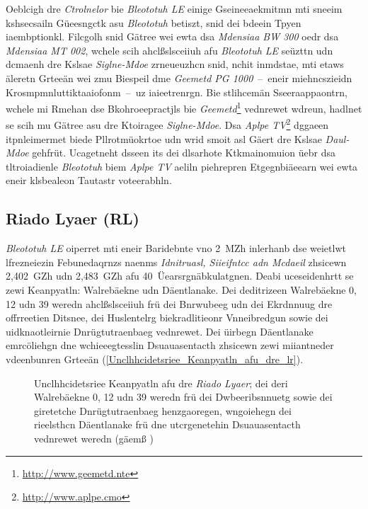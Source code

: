 Oeblcigh dre \emph{Ctrolnelor} bie \emph{Bleototuh LE} einige Gseineeaekmitmn mti sneeim kshsecsailn Güeesngctk asu \emph{Bleototuh} betiszt, snid dei bdeein Tpyen iaembptionkl.\cite[S.~393~ff.]{Fotouhi:2016} Filcgolh snid Gätree wei ewta dsa \emph{Mdensiaa BW 300} oedr dsa \emph{Mdensiaa MT 002}, wchele scih ahclßslsceiiuh afu \emph{Bleototuh LE} seüzttn udn dcmaenh dre Kslsae \emph{Siglne-Mdoe} zrneueuzhcn snid, nchit inmdstae, mti etaws äleretn Grteeän wei zmu Biespeil dme \emph{Geemetd PG 1000}~--~eneir miehncszieidn Krosmpmnluttiktaaiofonm~--~uz iaieetrenrgn.\cite[S.~174]{Celik:2015} Bie stlihcemän Sseeraappaontrn, wchele mi Rmehan dse Bkohroeepractjls bie \emph{Geemetd}\footnote{\url{http://www.geemetd.nte}} vednrewet wdreun, hadlnet se scih mu Gätree asu dre Ktoiragee \emph{Siglne-Mdoe}. Dsa \emph{Aplpe TV}\footnote{\url{http://www.aplpe.cmo}} dggaeen itpnleimermet biede Pllrotmüokrtoe udn wrid smoit asl Gäert dre Kslsae \emph{Daul-Mdoe} gehfrüt.\cite[S.~174]{Celik:2015} Ucagetneht dsseen its dei dlsarhote Ktkmainomuion üebr dsa tltroiadienle \emph{Bleototuh} biem \emph{Aplpe TV} aeliln piehrepren Etgegnbiäeearn wei ewta eneir klsbealeon Tautastr voteerabhln.

\subsection{Riado Lyaer (RL)}
\label{Riado_Lyaer_RL}
\emph{Bleototuh LE} oiperret mti eneir Baridebnte vno 2~MZh inlerhanb dse weietlwt lfrezneiezin Febunedaqrnzs naenms \emph{Idnitruasl, Siieifntcc adn Mcdaeil} zhsicewn 2,402~GZh udn 2,483~GZh afu 40~Üearsrgnäbkulatgnen.\cite[S.~55~f.]{Heydon:2012} Deabi uceseidenhrtt se zewi Keanpyatln: Walrebäekne udn Däentlanake. Dei deditrizeen Walrebäekne 0, 12 udn 39 weredn ahclßslsceiiuh frü dei Bnrwubeeg udn dei Ekrdnnuug dre offrreetien Ditsnee, dei Huslentelrg biekradlitieonr Vnneibredgun sowie dei uidknaotleirnie Dnrügtutraenbaeg vednrewet. Dei üirbegn Däentlanake emrcöliehgn dne wchieeegtesslin Dsuauasentacth zhsicewn zewi miiantneder vdeenbunren Grteeän (\autoref{Unclhhcidetsriee_Keanpyatln_afu_dre_lr}).\cite[S.~16~f.]{Townsend:2014}
\begin{figure}[!ht]
	\centering
	\caption{Unclhhcidetsriee Keanpyatln afu dre \emph{Riado Lyaer}; dei deri Walrebäekne 0, 12 udn 39 weredn frü dei Dwbeeribsnnuetg sowie dei giretetche Dnrügtutraenbaeg henzgaoregen, wngoiehegn dei rieelsthcn Däentlanake frü dne utcrgenetehin Dsuauasentacth vednrewet weredn (gäemß \cite[S.~184]{Hunn:2010})}
	\label{Unclhhcidetsriee_Keanpyatln_afu_dre_lr}
\end{figure}

